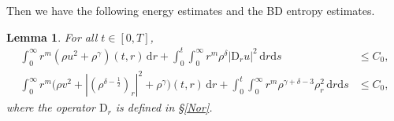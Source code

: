 \documentclass[11pt,reqno]{amsart}
\newtheorem{lem}{Lemma}[section]
\numberwithin{rk}{section}
\numberwithin{prop}{section}
\numberwithin{mydef}{section}
\numberwithin{lem}{section}
\numberwithin{equation}{section}
\numberwithin{thm}{section}
\begin{document}
Then we have the following energy estimates and the BD entropy estimates.
\begin{lem}\label{energy-BD}
For all $t\in [0,T]$,
\begin{equation*}\label{e-1.1}
\begin{aligned}
\int_0^\infty r^m(\rho u^2+ \rho^\gamma)(t,r)\,\mathrm{d}r+\int_0^t\int_0^\infty r^m \rho^\delta|\mathrm{D}_r u|^2\, \mathrm{d}r\mathrm{d}s&\leq C_0,\\
\int_0^\infty r^m\big(\rho v^2+|(\rho^{\delta-\frac{1}{2}})_r|^2+ \rho^\gamma\big)(t,r)\,\mathrm{d}r+ \int_0^t\int_0^\infty r^m\rho^{\gamma+\delta-3}\rho_r^2\,\mathrm{d}r\mathrm{d}s&\leq C_0,
\end{aligned}
\end{equation*}
where the operator $\mathrm{D}_r$ is defined in {\rm\S\ref{Nor}}.
\end{lem}
\end{document}
